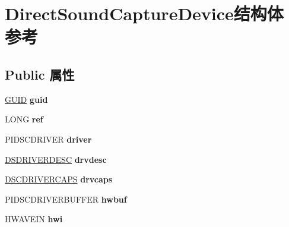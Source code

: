 \hypertarget{struct_direct_sound_capture_device}{}\section{Direct\+Sound\+Capture\+Device结构体 参考}
\label{struct_direct_sound_capture_device}
\subsection*{Public 属性}
\begin{DoxyCompactItemize}
\item 
\mbox{\label{struct_direct_sound_capture_device_a6902f9d71d5e7fef3b16fbf03577d67d}} 
\hyperlink{interface_g_u_i_d}{G\+U\+ID} {\bfseries guid}
\item 
\mbox{\label{struct_direct_sound_capture_device_a2876fe9fee8324fa929cab5a341585a0}} 
L\+O\+NG {\bfseries ref}
\item 
\mbox{\label{struct_direct_sound_capture_device_a286df53874e6c9e3b7381c34ee9b47b6}} 
P\+I\+D\+S\+C\+D\+R\+I\+V\+ER {\bfseries driver}
\item 
\mbox{\label{struct_direct_sound_capture_device_a0f0beb46dd778b2818dde1cf6c81f3ef}} 
\hyperlink{struct___d_s_d_r_i_v_e_r_d_e_s_c}{D\+S\+D\+R\+I\+V\+E\+R\+D\+E\+SC} {\bfseries drvdesc}
\item 
\mbox{\label{struct_direct_sound_capture_device_ad6c49cf98b691e1b191d9dc9c862f278}} 
\hyperlink{struct___d_s_c_d_r_i_v_e_r_c_a_p_s}{D\+S\+C\+D\+R\+I\+V\+E\+R\+C\+A\+PS} {\bfseries drvcaps}
\item 
\mbox{\label{struct_direct_sound_capture_device_af555152c4bbb6d6a6e79871ea34986a4}} 
P\+I\+D\+S\+C\+D\+R\+I\+V\+E\+R\+B\+U\+F\+F\+ER {\bfseries hwbuf}
\item 
\mbox{\label{struct_direct_sound_capture_device_a8d8c665659dcd79069d0a98e6762a9b6}} 
H\+W\+A\+V\+E\+IN {\bfseries hwi}
\item 

\end{DoxyCompactItemize}
